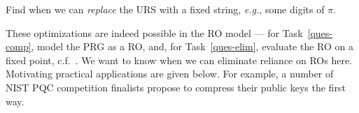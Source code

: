 

\begin{task} \label{ques-elim}
Find when  we can  \emph{replace} the URS with a fixed string, \emph{e.g.}, some digits of $\pi$.
\end{task}

These optimizations are indeed possible in the RO model --- for Task~\ref{ques-comp}, model the PRG as a RO, and, for Task~\ref{ques-elim}, evaluate the RO on a fixed point, c.f.~\cite{CCS:CanJaiSca14}.  We want to know when we can eliminate reliance on ROs here. %
   Motivating practical applications are given below.  For example, a number of NIST PQC competition finalists propose to compress their public keys the first way.






